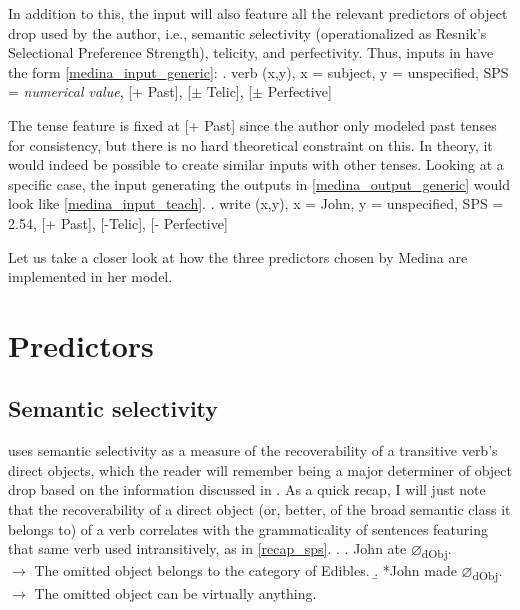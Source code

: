 In addition to this, the input will also feature all the relevant predictors of object drop used by the author, i.e., semantic selectivity (operationalized as Resnik's Selectional Preference Strength), telicity, and perfectivity. Thus, inputs in \textcite{Medina2007} have the form \ref{medina_input_generic}:
\ex. \label{medina_input_generic} verb (x,y), x = subject, y = unspecified, SPS = \textit{numerical value}, [+ Past], [$\pm$ Telic], [$\pm$ Perfective]

The tense feature is fixed at [+ Past] since the author only modeled past tenses for consistency, but there is no hard theoretical constraint on this. In theory, it would indeed be possible to create similar inputs with other tenses. Looking at a specific case, the input generating the outputs in \ref{medina_output_generic} would look like \ref{medina_input_teach}.
\ex. \label{medina_input_teach} write (x,y), x = John, y = unspecified, SPS = 2.54, [+ Past], [-Telic], [- Perfective]

Let us take a closer look at how the three predictors chosen by Medina are implemented in her model.


\section{Predictors} 

\subsection{Semantic selectivity} 

\textcite{Medina2007} uses semantic selectivity as a measure of the recoverability of a transitive verb's direct objects, which the reader will remember being a major determiner of object drop based on the information discussed in . As a quick recap, I will just note that the recoverability of a direct object (or, better, of the broad semantic class it belongs to) of a verb correlates with the grammaticality of sentences featuring that same verb used intransitively, as in \ref{recap_sps}.
\ex. \label{recap_sps} \a. John ate $\varnothing$\textsubscript{dObj}. \\ $\longrightarrow$ The omitted object belongs to the category of Edibles.
\b. *John made $\varnothing$\textsubscript{dObj}. \\ $\longrightarrow$ The omitted object can be virtually anything.

